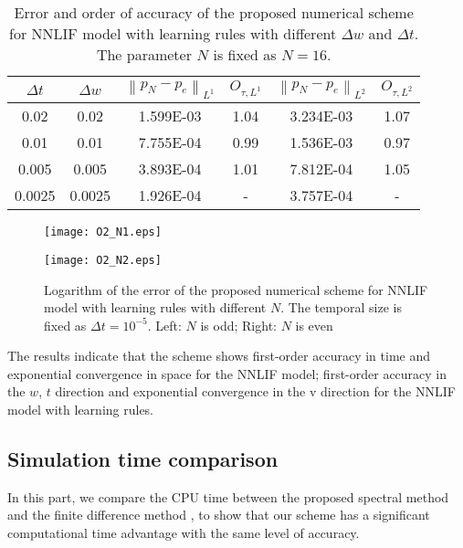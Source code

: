 \begin{table}[!htb]
	\centering
	\begin{tabularx}{10cm}{cccccc}
	\toprule
	$\Delta t$ &$\Delta w$ & $\left\| p_N-p_e \right\|_{L^{1}}$& $O_{\tau,L^{1}}$& $\left\| p_N-p_e \right\|_{L^2}$& {$O_{\tau,L^2}$}\\ 
	\midrule
	0.02 &0.02 & 1.599E-03 &1.04 & 3.234E-03 &1.07 \\
	0.01 &0.01 & 7.755E-04 & 0.99 & 1.536E-03 &0.97 \\
	0.005 &0.005 &3.893E-04 & 1.01 &7.812E-04&1.05 \\
    0.0025 & 0.0025 & 1.926E-04 & - &3.757E-04& - \\
	\bottomrule
    \end{tabularx}
    \caption{Error and order of accuracy of the proposed numerical scheme for NNLIF model with learning rules with different ${\Delta w}$ and ${\Delta t}$. The parameter $N$ is fixed as $N=16$.}
    \label{convergence3}
\end{table}
\begin{figure}[!htb]
    \centering
        \begin{minipage}[c]{0.49\textwidth}
            \centering
            \texttt{[image: O2\_N1.eps]}
        \end{minipage}
        \begin{minipage}[c]{0.49\textwidth}
            \centering
            \texttt{[image: O2\_N2.eps]}
        \end{minipage}
		\caption{Logarithm of the error of the proposed numerical scheme for NNLIF model with learning rules with different $N$. The temporal size is fixed as $\Delta t=10^{-5}$. Left: $N$ is odd; Right: $N$ is even}
  \label{convergence4}
\end{figure}

The results indicate that the scheme shows first-order accuracy in time and exponential convergence in space for the NNLIF model; first-order accuracy in the $w$, $t$ direction and exponential convergence in the v direction for the NNLIF model with learning rules.






\subsection{Simulation time comparison}\label{sec:time_saving}
In this part, we compare the CPU time between the proposed spectral method and the finite difference method \cite{hu2021structure}, to show that our scheme has a significant computational time advantage with the same level of accuracy.



